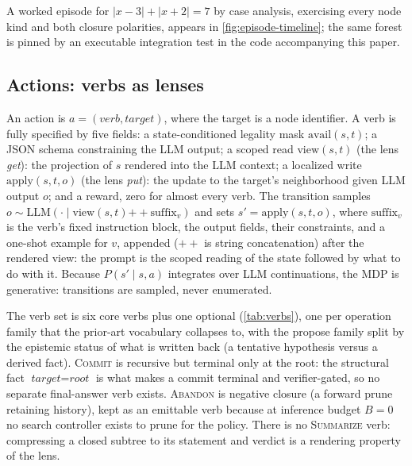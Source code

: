 A worked episode for $|x-3| + |x+2| = 7$ by case analysis, exercising
every node kind and both closure polarities, appears in
\cref{fig:episode-timeline}; the same forest is pinned by an executable
integration test in the code accompanying this paper.



\subsection{Actions: verbs as lenses}
\label{sec:method-actions}

An action is $a = (\textit{verb}, \textit{target})$, where the target is a
node identifier. A verb is fully specified by five fields: a
state-conditioned legality mask $\mathrm{avail}(s,t)$; a JSON schema
constraining the LLM output; a scoped read $\mathrm{view}(s,t)$ (the lens
\emph{get}): the projection of $s$ rendered into the LLM context; a
localized write $\mathrm{apply}(s,t,o)$ (the lens \emph{put}): the update to
the target's neighborhood given LLM output $o$; and a reward, zero for
almost every verb. The transition samples
$o \sim \mathrm{LLM}(\cdot \mid \mathrm{view}(s,t) \mathbin{+\!\!+} \mathrm{suffix}_v)$
and sets $s' = \mathrm{apply}(s,t,o)$, where $\mathrm{suffix}_v$ is the
verb's fixed instruction block, the output fields, their constraints, and
a one-shot example for $v$, appended ($\mathbin{+\!\!+}$ is string
concatenation) after the rendered view: the prompt is the scoped reading
of the state followed by what to do with it. Because $P(s' \mid s, a)$
integrates over LLM continuations, the MDP is generative: transitions are
sampled, never enumerated.

The verb set is six core verbs plus one optional
(\cref{tab:verbs}), one per operation family that the prior-art vocabulary
collapses to, with the propose family split by the epistemic status of what
is written back (a tentative hypothesis versus a derived fact).
\textsc{Commit} is recursive but terminal only at the root: the structural
fact $\textit{target} = \textit{root}$ is what makes a commit terminal and
verifier-gated, so no separate final-answer verb exists. \textsc{Abandon}
is negative closure (a forward prune retaining history), kept as an
emittable verb because at inference budget $B{=}0$ no search controller
exists to prune for the policy. There is no \textsc{Summarize} verb:
compressing a closed subtree to its statement and verdict is a rendering
property of the lens.

